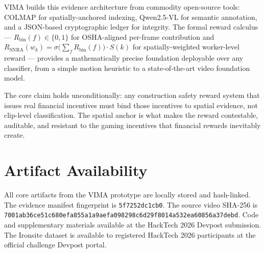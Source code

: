 \documentclass[sigconf,nonacm]{acmart}
\begin{document}
VIMA builds this evidence architecture from commodity open-source tools: COLMAP
for spatially-anchored indexing, Qwen2.5-VL for semantic annotation, and a
JSON-based cryptographic ledger for integrity. The formal reward calculus ---
$R_{\text{bin}}(f) \in \{0,1\}$ for OSHA-aligned per-frame contribution and
$R_{\text{SNRA}}(w_k) = \sigma\!\bigl(\sum_f R_{\text{bin}}(f)\bigr) \cdot S(k)$
for spatially-weighted worker-level reward --- provides a mathematically precise
foundation deployable over any classifier, from a simple motion heuristic to
a state-of-the-art video foundation model.

The core claim holds unconditionally: any construction safety reward system
that issues real financial incentives must bind those incentives to spatial
evidence, not clip-level classification. The spatial anchor is what makes
the reward contestable, auditable, and resistant to the gaming incentives
that financial rewards inevitably create.

\section*{Artifact Availability}

All core artifacts from the VIMA prototype are locally stored and hash-linked.
The evidence manifest fingerprint is \texttt{5f7252dc1cb0}. The source video
SHA-256 is
\texttt{7001ab36ce51c680efa855a1a9aefa0982\allowbreak{}98c6d29f8014a532ea60856a37debd}.
Code and supplementary materials available at the HackTech 2026 Devpost
submission. The Ironsite dataset is available to registered HackTech 2026
participants at the official challenge Devpost portal.



\end{document}

